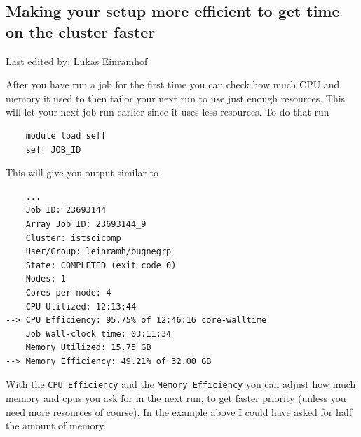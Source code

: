 \documentclass{article}
\newcommand{\setlasteditor}[1]{\gdef\lasteditor{#1}}
\newcommand{\lastedited}{%
    \vspace{1mm} {\footnotesize Last edited by: \lasteditor} \vspace{3mm}
    \newline

}
\begin{document}
\subsection{Making your setup more efficient to get time on the cluster faster}
\setlasteditor{Lukas Einramhof}
\lastedited
\noindent
After you have run a job for the first time you can check how much CPU and memory it used to then tailor your next run to use just enough resources. This will let your next job run earlier since it uses less resources.
To do that run
\begin{verbatim}
    module load seff
    seff JOB_ID
\end{verbatim}
This will give you output similar to
\begin{verbatim}
    ...
    Job ID: 23693144
    Array Job ID: 23693144_9
    Cluster: istscicomp
    User/Group: leinramh/bugnegrp
    State: COMPLETED (exit code 0)
    Nodes: 1
    Cores per node: 4
    CPU Utilized: 12:13:44
--> CPU Efficiency: 95.75% of 12:46:16 core-walltime
    Job Wall-clock time: 03:11:34
    Memory Utilized: 15.75 GB
--> Memory Efficiency: 49.21% of 32.00 GB
\end{verbatim}
With the \texttt{CPU Efficiency} and the \texttt{Memory Efficiency} you can adjust how much memory and cpus you ask for in the next run, to get faster priority (unless you need more resources of course).
In the example above I could have asked for half the amount of memory.
\end{document}
